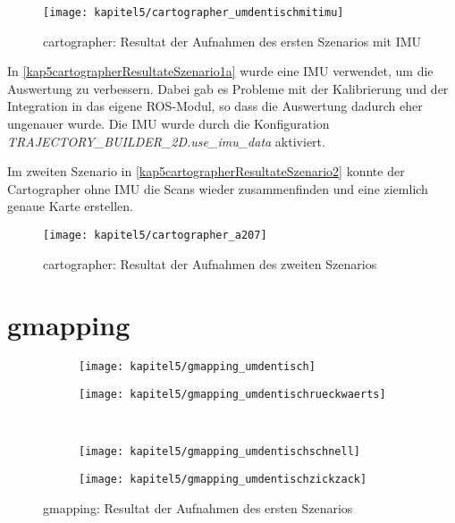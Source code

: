 \begin{figure}[b]
  \centering
  \texttt{[image: kapitel5/cartographer\_umdentischmitimu]}
  \caption{cartographer: Resultat der Aufnahmen des ersten Szenarios mit IMU}
  \label{kap5cartographerResultateSzenario1a}
\end{figure}

In \autoref{kap5cartographerResultateSzenario1a} wurde eine \ac{IMU} verwendet, um die Auswertung zu verbessern. Dabei gab es Probleme mit der Kalibrierung und der Integration in das eigene \ac{ROS}-Modul, so dass die Auswertung dadurch eher ungenauer wurde. Die \ac{IMU} wurde durch die Konfiguration \textit{TRAJECTORY\_BUILDER\_2D.use\_imu\_data} aktiviert.

Im zweiten Szenario in \autoref{kap5cartographerResultateSzenario2} konnte der Cartographer ohne \ac{IMU} die Scans wieder zusammenfinden und eine ziemlich genaue Karte erstellen.

\begin{figure}[b]
  \centering
  \texttt{[image: kapitel5/cartographer\_a207]}
  \caption{cartographer: Resultat der Aufnahmen des zweiten Szenarios}
  \label{kap5cartographerResultateSzenario2}
\end{figure}

\section{gmapping}

\begin{figure}[b]
  \centering
  \begin{subfigure}[b]{0.4\linewidth}
    \centering
    \texttt{[image: kapitel5/gmapping\_umdentisch]}
    \label{kap5:gmapping1}
  \end{subfigure}%
  \qquad
  \begin{subfigure}[b]{.4\linewidth}
    \centering
    \texttt{[image: kapitel5/gmapping\_umdentischrueckwaerts]}
    \label{kap5:gmapping2}
  \end{subfigure}\\
  \vspace{2\floatsep}
  \begin{subfigure}[b]{.4\linewidth}
    \centering
    \texttt{[image: kapitel5/gmapping\_umdentischschnell]}
    \label{kap5:gmapping3}
  \end{subfigure}%
    \qquad
  \begin{subfigure}[b]{.4\linewidth}
    \centering
    \texttt{[image: kapitel5/gmapping\_umdentischzickzack]}
    \label{kap5:gmapping4}
  \end{subfigure}%
  \qquad
  \caption{gmapping: Resultat der Aufnahmen des ersten Szenarios}
  \label{kap5GmappingResultateSzenario1}
\end{figure}

